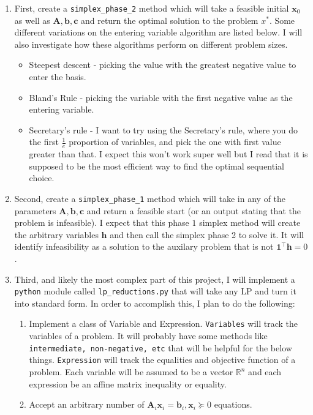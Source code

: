 \documentclass[11pt]{article}
\begin{document}
\begin{enumerate}
    \item First, create a \texttt{simplex\_phase\_2} method which will take a feasible initial $\textbf{x}_0$ as well as $\textbf{A},\textbf{b}, \textbf{c}$ and return the optimal solution to the problem $x^*$.
          Some different variations on the entering variable algorithm are listed below.
          I will also investigate how these algorithms perform on different problem sizes.
        \begin{itemize}
            \item Steepest descent - picking the value with the greatest negative value to enter the basis.
            \item Bland's Rule - picking the variable with the first negative value as the entering variable.
            \item Secretary's rule - I want to try using the Secretary's rule, where you do the first $\frac{1}{e}$ proportion of variables, and pick the one with first value greater than that.
                  I expect this won't work super well but I read that it is supposed to be the most efficient way to find the optimal sequential choice.
        \end{itemize}
    \item Second, create a \texttt{simplex\_phase\_1} method which will take in any of the parameters $\textbf{A},\textbf{b}, \textbf{c}$ and return a feasible start (or an output stating that the problem is infeasible).
          I expect that this phase $1$ simplex method will create the arbitrary variables $\textbf{h}$ and then call the simplex phase 2 to solve it.
          It will identify infeasibility as a solution to the auxilary problem that is not $\textbf{1}^\top \textbf{h} = 0$.
    \item Third, and likely the most complex part of this project, I will implement a \texttt{python} module called \texttt{lp\_reductions.py} that will take any LP and turn it into standard form.
          In order to accomplish this, I plan to do the following:
          \begin{enumerate}
            \item Implement a class of Variable and Expression.
                  \texttt{Variables} will track the variables of a problem. It will probably have some methods like \texttt{intermediate, non-negative, etc} that will be helpful for the below things.
                  \texttt{Expression} will track the equalities and objective function of a problem.
                  Each variable will be assumed to be a vector $\mathbb{R}^n$ and each expression be an affine matrix inequality or equality.
            \item Accept an arbitrary number of $\textbf{A}_i \textbf{x}_i = \textbf{b}_i, \textbf{x}_i \succeq 0$ equations.
                  

\end{enumerate}
\end{enumerate}
\end{document}
